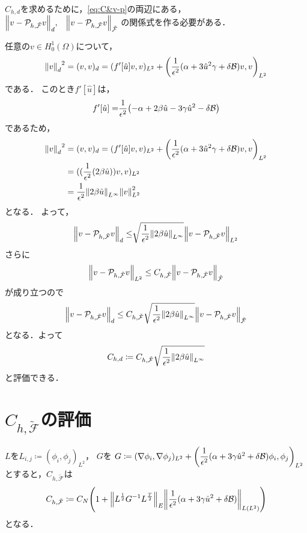 \(C_{h,d}\)を求めるために，\eqref{eq:C&v-p}の両辺にある，\\
\(
  \norm{v-\mathcal{P}_{h,\tilde{\mathcal{F}}}v}_d ,\;\;\; \norm{v-\mathcal{P}_{h,\tilde{\mathcal{F}}}v}_{\tilde{\mathcal{F}}}
\)
の関係式を作る必要がある．

任意の\( v \in H^1_0(\Omega)\)について，
\begin{align}
  {\norm{v}_d}^2 =(v,v)_d =(f'[\hat{u}]v,v)_{L^2}+\qty(\dfrac{1}{\epsilon^2}(\alpha + 3\hat{u}^2\gamma +\delta \mathcal{B})v,v)_{L^2}
\end{align}
である．
このとき\(f'[\hat{u}]\)は，
\begin{align}
  f'[\hat{u}]=&\dfrac{1}{\epsilon^2}\qty(-\alpha+2\beta\hat{u}-3\gamma\hat{u}^2-\delta\mathcal{B})\\
\end{align}
であるため，
\begin{align}
  {\norm{v}_d}^2 &=(v,v)_d =(f'[\hat{u}]v,v)_{L^2}+\qty(\dfrac{1}{\epsilon^2}(\alpha + 3\hat{u}^2\gamma +\delta \mathcal{B})v,v)_{L^2}\\
  &=((\dfrac{1}{\epsilon^2}\qty(2\beta\hat{u}))v,v)_{L^2}\\
  &=\dfrac{1}{\epsilon^2}\norm{2\beta\hat{u}}_{L^\infty}\norm{v}_{L^2}^2
\end{align}
となる．
よって，
\begin{align}
  \norm{v-\mathcal{P}_{h,\tilde{\mathcal{F}}}v}_d 
  \leq&\sqrt{\dfrac{1}{\epsilon^2}\norm{2\beta\hat{u}}_{L^\infty}}\norm{v-\mathcal{P}_{h,\tilde{\mathcal{F}}}v}_{L^2}\\
\end{align}
さらに
\begin{align}
  \norm{v-\mathcal{P}_{h,\tilde{\mathcal{F}}}v}_{L^2}
  \leq
  C_{h,\tilde{\mathcal{F}}}\norm{v-\mathcal{P}_{h,\tilde{\mathcal{F}}}v}_{\tilde{\mathcal{F}}}
\end{align}
が成り立つので
\begin{align}
  \norm{v-\mathcal{P}_{h,\tilde{\mathcal{F}}}v}_d\leq C_{h,\tilde{\mathcal{F}}}\sqrt{\dfrac{1}{\epsilon^2}\norm{2\beta\hat{u}}_{L^\infty}}\norm{v-\mathcal{P}_{h,\tilde{\mathcal{F}}}v}_{\tilde{\mathcal{F}}}
\end{align}
となる．よって
\begin{align}
  C_{h,d}\coloneqq C_{h,\tilde{\mathcal{F}}}\sqrt{\dfrac{1}{\epsilon^2}\norm{2\beta\hat{u}}_{L^\infty}}
\end{align}
と評価できる．

\section{\(C_{h,\tilde{\mathcal{F}}}\)の評価}
\(L\)を\(L_{i,j}\coloneqq(\phi_i,\phi_j)_{L^2}\)，
\(G\)を
\(G\coloneqq (\nabla\phi_i,\nabla\phi_j)_{L^2}
+\qty(\dfrac{1}{\epsilon^2}(\alpha+3\gamma \hat{u}^2 + \delta \mathcal{B} )\phi_i,\phi_j)_{L^2}\)
とすると，\(C_{h,\tilde{\mathcal{F}}}\)は
\begin{align}
  C_{h,\tilde{\mathcal{F}}} \coloneqq 
  C_N\qty(1+\norm{L^{\frac{1}{2}}G^{-1}L^{\frac{T}{2}}}_E
  \norm{\dfrac{1}{\epsilon^2}(\alpha+3\gamma \hat{u}^2 + \delta \mathcal{B} )}_{L(L^2)})
\end{align}
となる．

